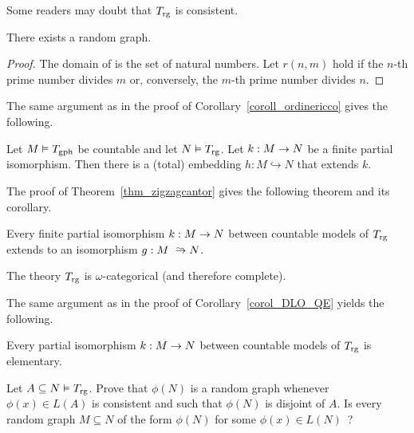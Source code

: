 Some readers may doubt that $T_{\rm rg}$ is consistent.

\begin{proposition}
There exists a random graph.
\end{proposition}
\begin{proof}
The domain of is the set of natural numbers.
Let $r(n,m)$ hold if the $n$-th prime number divides $m$ or, conversely, the $m$-th prime number divides $n$.
\end{proof}

The same argument as in the proof of Corollary~\ref{coroll_ordinericco} gives the following.

\begin{corollary}\label{coroll_graforicco}
Let $M\models T_{\rm gph}$ be countable and let $N\models T_{\rm rg}$.
Let $k:M\imp N$ be a finite partial isomorphism.
Then there is a (total) embedding $h:M\hookrightarrow N$ that extends $k$.
\end{corollary}

The proof of Theorem~\ref{thm_zigzagcantor} gives the following theorem and its corollary.

\begin{theorem}\label{gaomegacat}
Every finite partial isomorphism $k:M\imp N$ between countable models of $T_{\rm rg}$ extends to an isomorphism $g:M\isomap N$.
\end{theorem}

\begin{corollary}\label{corol_RG_omegacat}
The theory $T_{\rm rg}$ is $\omega$-categorical (and therefore complete).
\end{corollary}

The same argument as in the proof of Corollary~\ref{corol_DLO_QE} yields the following.

\begin{corollary}\label{corol_RG_QE}
  Every partial isomorphism $k:M\imp N$ between countable models of $T_{\rm rg}$ is elementary.
\end{corollary}


\begin{exercise}\label{ex_r(b,N)}
Let $A\subseteq N\models T_{\rm rg}$.
Prove that $\phi(N)$ is a random graph whenever $\phi(x)\in L(A)$ is consistent and such that $\phi(N)$ is disjoint of $A$.
Is every random graph $M\subseteq N$ of the form $\phi(N)$ for some $\phi(x)\in L(N)$~?
\end{exercise}

